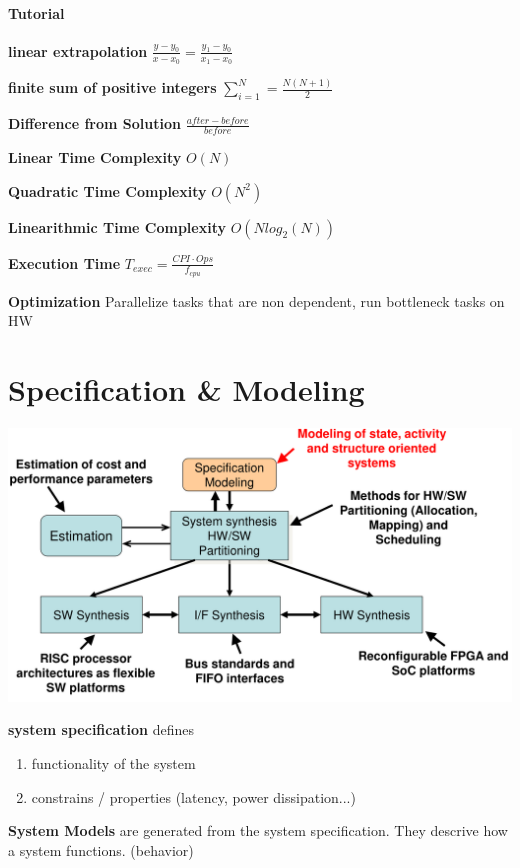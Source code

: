 \documentclass[english]{latex4ei/latex4ei_sheet}
\begin{document}
\paragraph{Tutorial}

\textbf{linear extrapolation} $\frac{y - y_0}{x - x_0} = \frac{y_1 - y_0}{x_1 - x_0}$

\textbf{finite sum of positive integers} $\sum_{i=1}^{N} = \frac{N(N+1)}{2}$

\textbf{Difference from Solution} $\frac{after - before}{before}$
 
\textbf{Linear Time Complexity} $ O(N)$

\textbf{Quadratic Time Complexity} $ O(N^2)$

\textbf{Linearithmic Time Complexity} $ O(N log_2(N))$

\textbf{Execution Time} $T_{exec} = \frac{CPI \cdot Ops}{f_{cpu}}$
 
\textbf{Optimization} Parallelize tasks that are non dependent, run bottleneck tasks on HW


\section{Specification \& Modeling}

\begin{center}
  \includegraphics[width=0.8\linewidth]{assets/DesignFlowSystemLevel.png}
\end{center}

\textbf{system specification} defines
\begin{enumerate}
	\item functionality of the system
	\item constrains / properties (latency, power dissipation...)
\end{enumerate}

\textbf{System Models} are generated from the system specification. They descrive how a system functions. (behavior)
\end{document}
